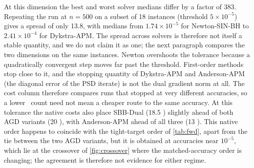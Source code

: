At this dimension the best and worst solver medians differ by a
factor of 383. Repeating the run at $n=500$ on a subset
of 18 instances (threshold $5\times10^{-5}$) gives a spread of only 13.8, with
medians from $1.74\times10^{-5}$ for Newton-SIN-BH to $2.41\times10^{-4}$ for
Dykstra-APM. The spread across solvers is therefore not itself a stable
quantity, and we do not claim it as one; the next paragraph compares the two
dimensions on the same instances. Newton
overshoots the tolerance because a quadratically convergent step moves far
past the threshold. First-order methods stop close to it, and the stopping
quantity of Dykstra-APM and Anderson-APM (the diagonal error of the PSD
iterate) is not the dual gradient norm at all. The cost column therefore
compares runs that stopped at very different accuracies, so a lower \EVD\
count need not mean a cheaper route to the same accuracy. At this tolerance the
native costs also place SBB-Dual (18.5 \EVDs) slightly ahead of both AGD
variants (20 \EVDs), with Anderson-APM ahead of all three (13 \EVDs). This
native order happens to coincide with the tight-target order of
\cref{tab:fwd}, apart from the tie between the two AGD variants, but it is
obtained at accuracies near $10^{-5}$, which lie at the crossover of
\cref{fig:crossover} where the matched-accuracy order is changing; the
agreement is therefore not evidence for either regime.

